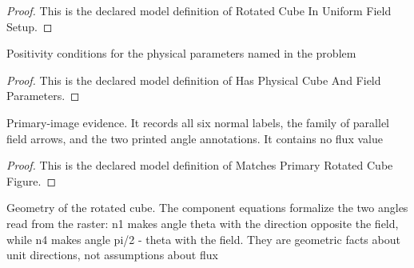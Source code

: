 \begin{proof}
  This is the declared model definition of Rotated Cube In Uniform Field Setup.
\end{proof}
\begin{definition}
  \label{def:physics:phyx-mini-0999:phyxminiproblems-problemphyxmini0999-hasphysicalcubeandfieldparameters}
  Positivity conditions for the physical parameters named in the problem
\end{definition}
\begin{proof}
  This is the declared model definition of Has Physical Cube And Field Parameters.
\end{proof}
\begin{definition}
  \label{def:physics:phyx-mini-0999:phyxminiproblems-problemphyxmini0999-matchesprimaryrotatedcubefigure}
  Primary-image evidence. It records all six normal labels, the family of parallel field arrows, and the two printed angle annotations. It contains no flux value
\end{definition}
\begin{proof}
  This is the declared model definition of Matches Primary Rotated Cube Figure.
\end{proof}
\begin{definition}
  \label{def:physics:phyx-mini-0999:phyxminiproblems-problemphyxmini0999-satisfiesrotatedcubegeometry}
  Geometry of the rotated cube. The component equations formalize the two angles read from the raster: n1 makes angle theta with the direction opposite the field, while n4 makes angle pi/2 - theta with the field. They are geometric facts about unit directions, not assumptions about flux
\end{definition}
